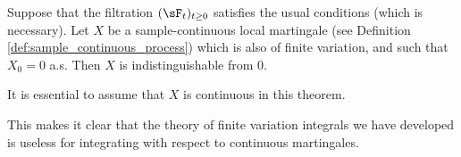 

\begin{theorem}\label{thm:local_martingale_indistinguishable_0}
Suppose that the filtration $(\sF_t)_{t\geq 0}$ satisfies the usual conditions (which is necessary). Let $X$ be a sample-continuous local martingale (see Definition \ref{def:sample_continuous_process}) which is also of finite variation, and such that $X_0 = 0$ a.s. Then $X$ is indistinguishable from 0.
\end{theorem}

\begin{remark}
It is essential to assume that $X$ is continuous in this theorem.

This makes it clear that the theory of finite variation integrals we have developed is useless for integrating with respect to continuous martingales.
\end{remark}

